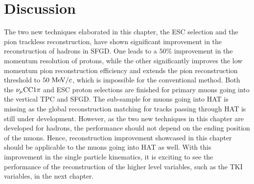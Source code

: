      \section{Discussion}
     \label{sec:technique-disc}
          The two new techniques elaborated in this chapter, the ESC selection and the pion trackless reconstruction, have shown significant improvement in the reconstruction of hadrons in SFGD.
          One leads to a $50\%$ improvement in the momentum resolution of protons, while the other significantly improves the low momentum pion reconstruction efficiency and extends the pion reconstruction threshold to $50~\textrm{MeV}/c$, which is impossible for the conventional method.
          Both the $\nu_{\mu}\textrm{CC}1\pi$ and ESC proton selections are finished for primary muons going into the vertical TPC and SFGD. 
          The sub-sample for muons going into HAT is missing as the global reconstruction matching for tracks passing through HAT is still under development.
          However, as the two new techniques in this chapter are developed for hadrons, the performance should not depend on the ending position of the muons.
          Hence, reconstruction improvement showcased in this chapter should be applicable to the muons going into HAT as well.
          With this improvement in the single particle kinematics, it is exciting to see the performance of the reconstruction of the higher level variables, such as the TKI variables, in the next chapter.